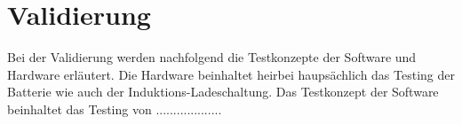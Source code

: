 \section{Validierung} \label{sec:validierung}

Bei der Validierung werden nachfolgend die Testkonzepte der Software und Hardware erläutert. Die Hardware beinhaltet heirbei haupsächlich das Testing der Batterie wie auch der Induktions-Ladeschaltung. Das Testkonzept der Software beinhaltet das Testing von ...................
